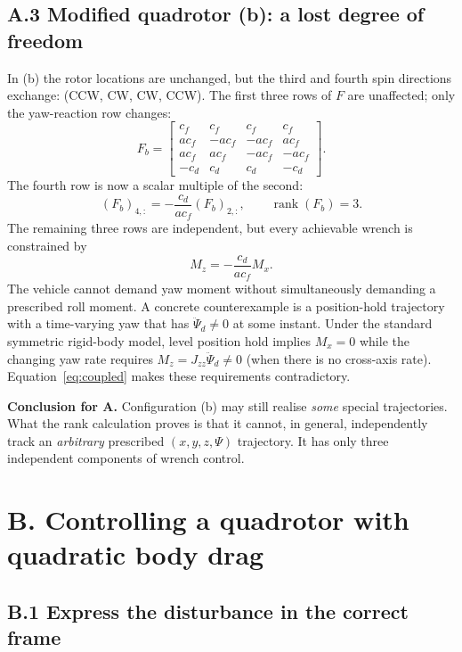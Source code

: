 \documentclass[10pt,a4paper]{article}
\begin{document}
\subsection*{A.3 Modified quadrotor (b): a lost degree of freedom}

In (b) the rotor locations are unchanged, but the third and fourth spin directions exchange: (CCW, CW, CW, CCW). The first three rows of $F$ are unaffected; only the yaw-reaction row changes:
\begin{equation}
\boxed{F_b=\begin{bmatrix}
 c_f&c_f&c_f&c_f\\
 ac_f&-ac_f&-ac_f&ac_f\\
 ac_f&ac_f&-ac_f&-ac_f\\
 -c_d&c_d&c_d&-c_d
\end{bmatrix}.}
\label{eq:fb}
\end{equation}
The fourth row is now a scalar multiple of the second:
\begin{equation}
(F_b)_{4,:}=-\frac{c_d}{ac_f}(F_b)_{2,:},\qquad
\boxed{\operatorname{rank}(F_b)=3}.\label{eq:fb_rank}
\end{equation}
The remaining three rows are independent, but every achievable wrench is constrained by
\begin{equation}
\boxed{M_z=-\frac{c_d}{ac_f}M_x.}
\label{eq:coupled}
\end{equation}
The vehicle cannot demand yaw moment without simultaneously demanding a prescribed roll moment. A concrete counterexample is a position-hold trajectory with a time-varying yaw that has $\ddot\Psi_d\ne0$ at some instant. Under the standard symmetric rigid-body model, level position hold implies $M_x=0$ while the changing yaw rate requires $M_z=J_{zz}\ddot\Psi_d\ne0$ (when there is no cross-axis rate). Equation~\eqref{eq:coupled} makes these requirements contradictory.

\textbf{Conclusion for A.} Configuration (b) may still realise \emph{some} special trajectories. What the rank calculation proves is that it cannot, in general, independently track an \emph{arbitrary} prescribed $(x,y,z,\Psi)$ trajectory. It has only three independent components of wrench control.

\section*{B. Controlling a quadrotor with quadratic body drag}

\subsection*{B.1 Express the disturbance in the correct frame}
\end{document}
